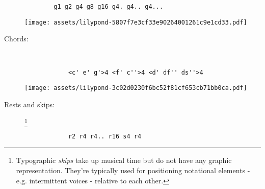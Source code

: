 \documentclass[a4paper]{tufte-handout}
\newenvironment{abjadbookoutput}{}{}
\begin{document}
\begin{description}
        \begin{verbatim}
        g1 g2 g4 g8 g16 g4. g4.. g4...
        \end{verbatim}

        \begin{comment}
        <lilypond>stylesheet=stylesheet-minimal.ily]
        { g1 g2 g4 g8 g16 g4. g4.. g4... }
        </lilypond>
        \end{comment}

        \begin{abjadbookoutput}
        \noindent\texttt{[image: assets/lilypond-5807f7e3cf33e90264001261c9e1cd33.pdf]}
        \end{abjadbookoutput}

    \item[Chords:]
        \hfill \vspace{-\baselineskip} \\
        \begin{multicols}{2}

            \begin{verbatim}
            <c' e' g'>4 <f' c''>4 <d' df'' ds''>4
            \end{verbatim}

            \begin{comment}
            <lilypond>[stylesheet=stylesheet-minimal.ily]
            { <c' e' g'>4 <f' c''>4 <d' df'' ds''>4 }
            </lilypond>
            \end{comment}

            \begin{abjadbookoutput}
            \noindent\texttt{[image: assets/lilypond-3c02d0230f6bc52f81cf653cb71bb0ca.pdf]}
            \end{abjadbookoutput}

        \end{multicols}

    \item[Rests and skips:]\footnote{%
        Typographic \emph{skips} take up musical time but do not have any
        graphic representation. They're typically used for positioning
        notational elements - e.g. intermittent voices - relative to each
        other.}
        \hfill \vspace{-\baselineskip} \\
        \begin{multicols}{2}

            \begin{verbatim}
            r2 r4 r4.. r16 s4 r4
            \end{verbatim}


\end{multicols}
\end{description}
\end{document}

